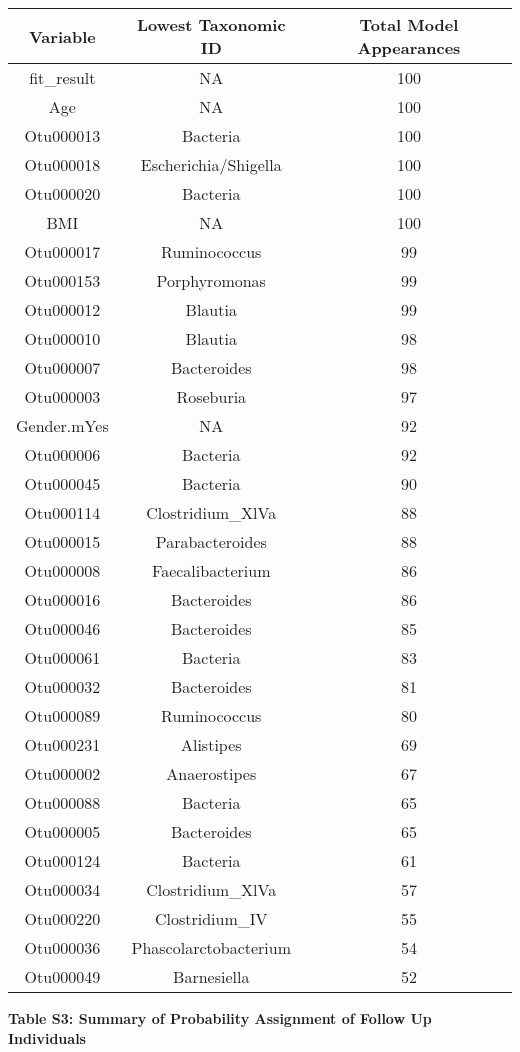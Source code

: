 \documentclass[12pt,]{article}
\begin{document}
\begin{longtable}[]{@{}ccc@{}}
\toprule
Variable & Lowest Taxonomic ID & Total Model Appearances\tabularnewline
\midrule
\endhead
fit\_result & NA & 100\tabularnewline
Age & NA & 100\tabularnewline
Otu000013 & Bacteria & 100\tabularnewline
Otu000018 & Escherichia/Shigella & 100\tabularnewline
Otu000020 & Bacteria & 100\tabularnewline
BMI & NA & 100\tabularnewline
Otu000017 & Ruminococcus & 99\tabularnewline
Otu000153 & Porphyromonas & 99\tabularnewline
Otu000012 & Blautia & 99\tabularnewline
Otu000010 & Blautia & 98\tabularnewline
Otu000007 & Bacteroides & 98\tabularnewline
Otu000003 & Roseburia & 97\tabularnewline
Gender.mYes & NA & 92\tabularnewline
Otu000006 & Bacteria & 92\tabularnewline
Otu000045 & Bacteria & 90\tabularnewline
Otu000114 & Clostridium\_XlVa & 88\tabularnewline
Otu000015 & Parabacteroides & 88\tabularnewline
Otu000008 & Faecalibacterium & 86\tabularnewline
Otu000016 & Bacteroides & 86\tabularnewline
Otu000046 & Bacteroides & 85\tabularnewline
Otu000061 & Bacteria & 83\tabularnewline
Otu000032 & Bacteroides & 81\tabularnewline
Otu000089 & Ruminococcus & 80\tabularnewline
Otu000231 & Alistipes & 69\tabularnewline
Otu000002 & Anaerostipes & 67\tabularnewline
Otu000088 & Bacteria & 65\tabularnewline
Otu000005 & Bacteroides & 65\tabularnewline
Otu000124 & Bacteria & 61\tabularnewline
Otu000034 & Clostridium\_XlVa & 57\tabularnewline
Otu000220 & Clostridium\_IV & 55\tabularnewline
Otu000036 & Phascolarctobacterium & 54\tabularnewline
Otu000049 & Barnesiella & 52\tabularnewline
\bottomrule
\end{longtable}

\newpage

\textbf{Table S3: Summary of Probability Assignment of Follow Up
Individuals}
\end{document}

